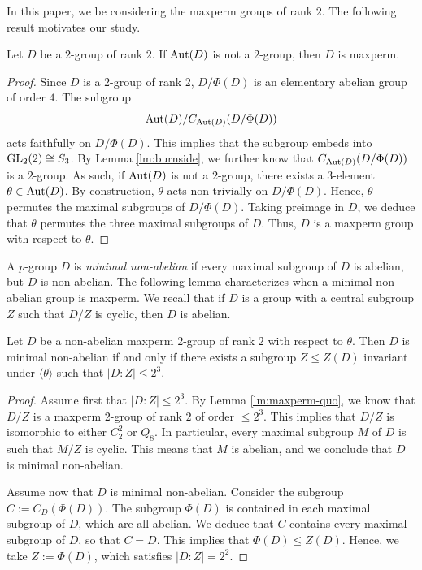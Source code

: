 \documentclass[bysection, amsart]{standard}
\begin{document}
In this paper, we be considering the maxperm groups of rank $2$. The following result motivates our study.
\begin{lemma} \label{lm:maxperm-rank2}
    Let $D$ be a $2$-group of rank $2$. If $\operatorname{Aut}(D)$ is not a $2$-group, then $D$ is maxperm.
\end{lemma}
\begin{proof}
    Since $D$ is a $2$-group of rank $2$, $D/\Phi(D)$ is an elementary abelian group of order $4$. The subgroup
    \[\operatorname{Aut}(D)/C_{\operatorname{Aut}(D)}(D/\Phi(D))\]
    acts faithfully on $D/\Phi(D)$. This implies that the subgroup embeds into $\operatorname{GL}_2(2) \cong S_3$. By Lemma \ref{lm:burnside}, we further know that $C_{\operatorname{Aut}(D)}(D/\Phi(D))$ is a $2$-group. As such, if $\operatorname{Aut}(D)$ is not a $2$-group, there exists a $3$-element $\theta \in \operatorname{Aut}(D)$. By construction, $\theta$ acts non-trivially on $D/\Phi(D)$. Hence, $\theta$ permutes the maximal subgroups of $D/\Phi(D)$. Taking preimage in $D$, we deduce that $\theta$ permutes the three maximal subgroups of $D$. Thus, $D$ is a maxperm group with respect to $\theta$.
\end{proof}

A $p$-group $D$ is \emph{minimal non-abelian} if every maximal subgroup of $D$ is abelian, but $D$ is non-abelian. The following lemma characterizes when a minimal non-abelian group is maxperm. We recall that if $D$ is a group with a central subgroup $Z$ such that $D/Z$ is cyclic, then $D$ is abelian.
\begin{lemma}\label{lm:maxperm-small}
    Let $D$ be a non-abelian maxperm $2$-group of rank $2$ with respect to $\theta$. Then $D$ is minimal non-abelian if and only if there exists a subgroup $Z \leq Z(D)$ invariant under $\langle \theta \rangle$ such that $|D : Z| \leq 2^3$.
\end{lemma}
\begin{proof}
    Assume first that $|D : Z| \leq 2^3$. By Lemma \ref{lm:maxperm-quo}, we know that $D/Z$ is a maxperm $2$-group of rank $2$ of order $\leq 2^3$. This implies that $D/Z$ is isomorphic to either $C_2^2$ or $Q_8$. In particular, every maximal subgroup $M$ of $D$ is such that $M/Z$ is cyclic. This means that $M$ is abelian, and we conclude that $D$ is minimal non-abelian.

    Assume now that $D$ is minimal non-abelian. Consider the subgroup $C := C_D(\Phi(D))$. The subgroup $\Phi(D)$ is contained in each maximal subgroup of $D$, which are all abelian. We deduce that $C$ contains every maximal subgroup of $D$, so that $C = D$. This implies that $\Phi(D) \leq Z(D)$. Hence, we take $Z := \Phi(D)$, which satisfies $|D : Z| = 2^2$.
\end{proof}
\end{document}
